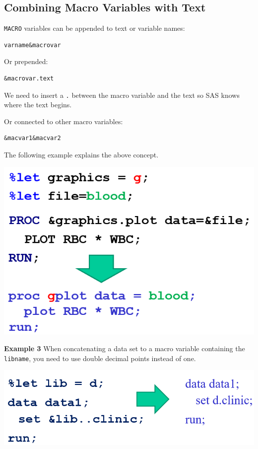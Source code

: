 \documentclass[
]{book}
\begin{document}
\hypertarget{combining-macro-variables-with-text}{%
\subsection{Combining Macro Variables with Text}\label{combining-macro-variables-with-text}}

\texttt{MACRO} variables can be appended to text or variable names:

\begin{verbatim}
varname&macrovar
\end{verbatim}

Or prepended:

\begin{verbatim}
&macrovar.text
\end{verbatim}

We need to insert a \texttt{.} between the macro variable and the text so SAS knows where the text begins.

Or connected to other macro variables:

\begin{verbatim}
&macvar1&macvar2
\end{verbatim}

The following example explains the above concept.

\begin{center}\includegraphics[width=0.5\linewidth]{img14/w14-CombinigMACROVariables} \end{center}

\textbf{Example 3} When concatenating a data set to a macro variable containing the \texttt{libname}, you need to use double decimal points instead of one.

\begin{center}\includegraphics[width=0.6\linewidth]{img14/w14-CombinigMACROVariables02} \end{center}
\end{document}
